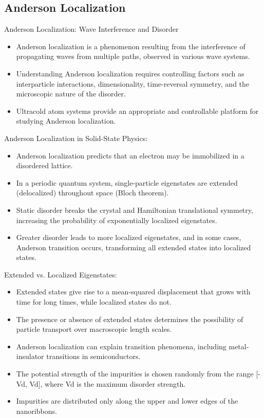 \documentclass[handout,t]{beamer}
\begin{document}
\subsection{Anderson Localization}
\begin{frame}{Anderson Localization: Wave Interference and Disorder}
	\begin{itemize}
		\item Anderson localization is a phenomenon resulting from the interference of propagating waves from multiple paths, observed in various wave systems.
		\item Understanding Anderson localization requires controlling factors such as interparticle interactions, dimensionality, time-reversal symmetry, and the microscopic nature of the disorder.
		\item Ultracold atom systems provide an appropriate and controllable platform for studying Anderson localization.
	\end{itemize}
\end{frame}
\begin{frame}{Anderson Localization in Solid-State Physics:}
	\begin{itemize}
		\item Anderson localization predicts that an electron may be immobilized in a disordered lattice.
		\item In a periodic quantum system, single-particle eigenstates are extended (delocalized) throughout space (Bloch theorem).
		\item Static disorder breaks the crystal and Hamiltonian translational symmetry, increasing the probability of exponentially localized eigenstates.
		\item Greater disorder leads to more localized eigenstates, and in some cases, Anderson transition occurs, transforming all extended states into localized states.
	\end{itemize}
\end{frame}
\begin{frame}{Extended vs. Localized Eigenstates:}
	\begin{itemize}
		\item Extended states give rise to a mean-squared displacement that grows with time for long times, while localized states do not.
		\item The presence or absence of extended states determines the possibility of particle transport over macroscopic length scales.
		\item Anderson localization can explain transition phenomena, including metal-insulator transitions in semiconductors.
		\item The potential strength of the impurities is chosen randomly from the range [-Vd, Vd], where Vd is the maximum disorder strength.
		\item Impurities are distributed only along the upper and lower edges of the nanoribbons.
	\end{itemize}
\end{frame}
\end{document}
